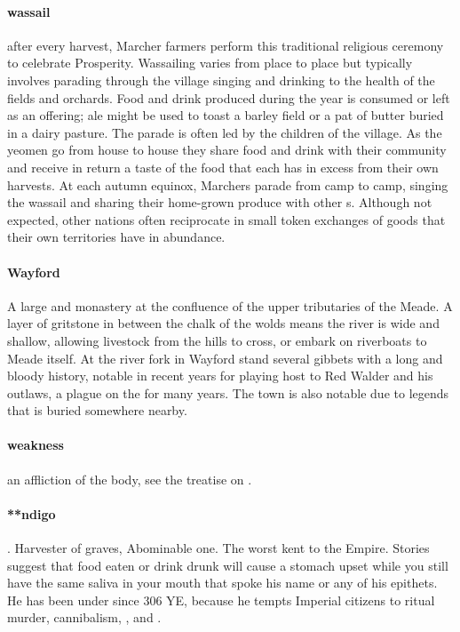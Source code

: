 \paragraph{wassail} after every harvest, Marcher farmers perform this traditional religious ceremony to celebrate Prosperity. Wassailing varies from place to place but typically involves parading through the village singing and drinking to the health of the fields and orchards. Food and drink produced during the year is consumed or left as an offering; ale might be used to toast a barley field or a pat of butter buried in a dairy pasture. The parade is often led by the children of the village. As the yeomen go from house to house they share food and drink with their community and receive in return a taste of the food that each  has in excess from their own harvests. At each autumn equinox, Marchers parade from camp to camp, singing the wassail and sharing their home-grown produce with other s. Although not expected, other nations often reciprocate in small token exchanges of goods that their own territories have in abundance.
\paragraph{Wayford} A large  and monastery at the confluence of the upper tributaries of the Meade. A layer of gritstone in between the chalk of the wolds means the river is wide and shallow, allowing livestock from the hills to cross, or embark on riverboats to Meade itself. At the river fork in Wayford stand several gibbets with a long and bloody history, notable in recent years for playing host to Red Walder and his outlaws, a plague on the  for many years. The town is also notable due to legends that  is buried somewhere nearby.
\paragraph{weakness} an affliction of the body, see the treatise on .
\paragraph{**ndigo}. Harvester of graves, Abominable one. The worst   kent to the Empire. Stories suggest that food eaten or drink drunk will cause a stomach upset while you still have the same saliva in your mouth that spoke his name or any of his epithets. He has been under  since 306 YE, because he tempts Imperial citizens to ritual murder, cannibalism, ,  and .
